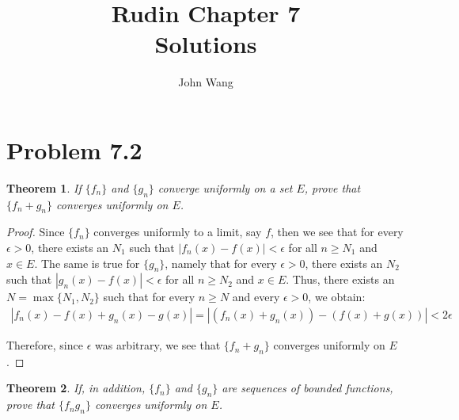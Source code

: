 \documentclass[psamsfonts]{amsart}
\title{Rudin Chapter 7\\
Solutions}
\author{John Wang}
\newtheorem{thm}{Theorem}[section]
\theoremstyle{definition}
\theoremstyle{remark}
\numberwithin{equation}{section}
\begin{document}
\maketitle

\section{Problem 7.2}

\begin{thm}
If $\{f_n \}$ and $\{ g_n \}$ converge uniformly on a set $E$, prove that $\{ f_n + g_n \}$ converges uniformly on $E$.
\end{thm}

\begin{proof}
Since $\{ f_n \}$ converges uniformly to a limit, say $f$, then we see that for every $\epsilon > 0$, there exists an $N_1$ such that $|f_n(x) - f(x) | < \epsilon$ for all $n \geq N_1$ and $x \in E$. The same is true for $\{g_n \}$, namely that for every $\epsilon > 0$, there exists an $N_2$ such that $|g_n(x) - f(x) | < \epsilon$ for all $n \geq N_2$ and $x \in E$. Thus, there exists an $N = \max\{N_1, N_2 \}$ such that for every $n \geq N$ and every $\epsilon > 0$, we obtain:
\begin{eqnarray}
|f_n(x) - f(x) + g_n(x) - g(x)| = |(f_n(x) + g_n(x)) - (f(x) + g(x)) | < 2 \epsilon
\end{eqnarray}

Therefore, since $\epsilon$ was arbitrary, we see that $\{ f_n + g_n \}$ converges uniformly on $E$.
\end{proof}

\begin{thm}
If, in addition, $\{ f_n \}$ and $\{ g_n \}$ are sequences of bounded functions, prove that $\{ f_n g_n \}$ converges uniformly on $E$.
\end{thm}
\end{document}
